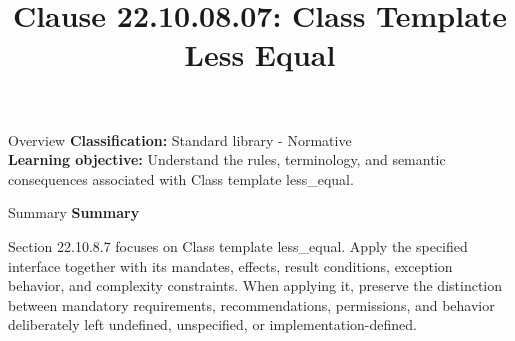 \documentclass[10pt,letterpaper]{article}
\title{Clause 22.10.08.07: Class Template Less Equal}
\author{}
\date{}
\begin{document}
\maketitle
\begin{CornellOverviewBox}{Overview}
\textbf{Classification:} Standard library - Normative\\[2pt]
\textbf{Learning objective:} Understand the rules, terminology, and semantic consequences associated with Class template less\_equal.
\end{CornellOverviewBox}\begin{CornellSummaryBox}{Summary}
{\sffamily\bfseries\color{Accent} Summary}\par\vspace{3pt}Section 22.10.8.7 focuses on Class template less\_equal. Apply the specified interface together with its mandates, effects, result conditions, exception behavior, and complexity constraints. When applying it, preserve the distinction between mandatory requirements, recommendations, permissions, and behavior deliberately left undefined, unspecified, or implementation-defined.
\end{CornellSummaryBox}
\end{document}

